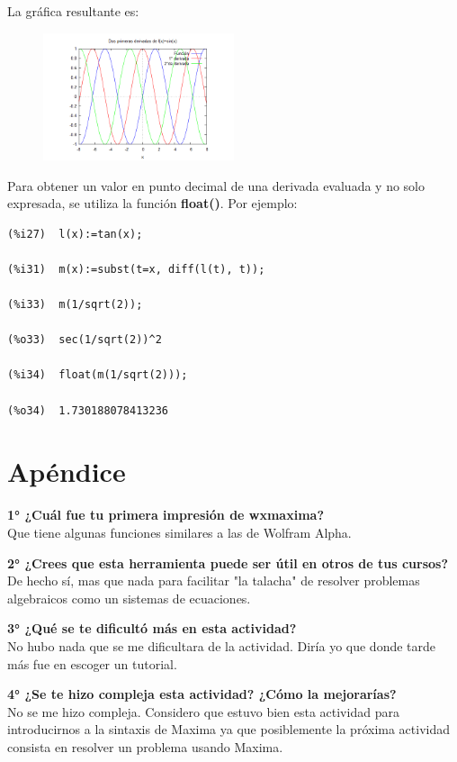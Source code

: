 \documentclass[a4paper]{article}
\begin{document}
La gráfica resultante es:

\begin{figure}[ht!]
\centering
\includegraphics[width=0.5\textwidth]{grafica2derivadas.png}
\end{figure}

\newpage

Para obtener un valor en punto decimal de una derivada evaluada y no solo expresada, se utiliza la función \textbf{float()}. Por ejemplo:

\begin{verbatim}
(%i27)	l(x):=tan(x);

(%i31)	m(x):=subst(t=x, diff(l(t), t));

(%i33)	m(1/sqrt(2));

(%o33)	sec(1/sqrt(2))^2

(%i34)	float(m(1/sqrt(2)));

(%o34)	1.730188078413236
\end{verbatim}






\section{Apéndice}

\textbf{1° ¿Cuál fue tu primera impresión de wxmaxima?}\\

Que tiene algunas funciones similares a las de Wolfram Alpha.

\textbf{2° ¿Crees que esta herramienta puede ser útil en otros de tus cursos?}\\
De hecho sí, mas que nada para facilitar "la talacha" de resolver problemas algebraicos como un sistemas de ecuaciones.

\textbf{3° ¿Qué se te dificultó más en esta actividad?}\\
No hubo nada que se me dificultara de la actividad. Diría yo que donde tarde más fue en escoger un tutorial. 

\textbf{4° ¿Se te hizo compleja esta actividad? ¿Cómo la mejorarías?}\\
No se me hizo compleja. Considero que estuvo bien esta actividad para introducirnos a la sintaxis de Maxima ya que posiblemente la próxima actividad consista en resolver un problema usando Maxima. 
\end{document}
